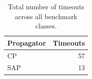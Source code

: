 \begin{table}[t]
\centering
\caption{Total number of timeouts across all benchmark classes.}
\label{tab:timeouts}
\begin{tabular}{lr}
\hline
Propagator & Timeouts \\
\hline
CP & 57 \\
SAP & 13 \\
\hline
\end{tabular}
\end{table}

